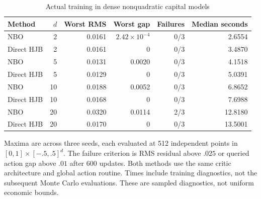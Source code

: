 \begin{table}[t]\centering
\caption{Actual training in dense nonquadratic capital models}\label{tab:coupled-r6}
\small\begin{tabular}{lrrrrr}
\toprule
Method & $d$ & Worst RMS & Worst gap & Failures & Median seconds\\\midrule
NBO & 2 & 0.0161 & $2.42\times10^{-4}$ & 0/3 & 2.6554\\
Direct HJB & 2 & 0.0161 & 0 & 0/3 & 3.4870\\
NBO & 5 & 0.0131 & 0.0020 & 0/3 & 4.1518\\
Direct HJB & 5 & 0.0129 & 0 & 0/3 & 5.0391\\
NBO & 10 & 0.0188 & 0.0052 & 0/3 & 6.8652\\
Direct HJB & 10 & 0.0168 & 0 & 0/3 & 7.6988\\
NBO & 20 & 0.0320 & 0.0114 & 2/3 & 12.8180\\
Direct HJB & 20 & 0.0170 & 0 & 0/3 & 13.5001\\
\bottomrule\end{tabular}
\par\smallskip\footnotesize Maxima are across three seeds, each evaluated at 512 independent points in $[0,1]\times[-.5,.5]^d$. The failure criterion is RMS residual above $.025$ or queried action gap above $.01$ after 600 updates. Both methods use the same critic architecture and global action routine. Times include training diagnostics, not the subsequent Monte Carlo evaluations. These are sampled diagnostics, not uniform economic bounds.
\end{table}

